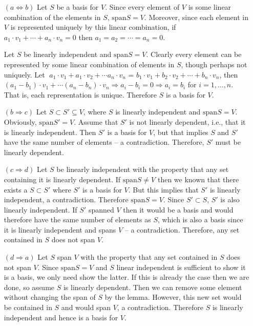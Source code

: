 \documentclass[12pt]{article}
\begin{document}
\begin{enumerate}
\begin{enumerate}
\item[$(a \Leftrightarrow b)$] Let $S$ be a basis for $V$.  Since every element of $V$ is some linear combination of the elements in $S$, $\mathrm{span} S = V$.  Moreover, since each element in $V$ is represented uniquely by this linear combination, if $a_1 \cdot v_1 + \cdots + a_n \cdot v_n = 0$ then $a_1=a_2=\cdots=a_n=0$.

Let $S$ be linearly independent and $\mathrm{span} S = V$.  Clearly every element can be represented by some linear combination of elements in $S$, though perhaps not uniquely.  Let 񄔳$a_1 \cdot v_1 + a_1 \cdot v_2 + \cdots a_n \cdot v_n$ = $b_1 \cdot v_1 + b_2 \cdot v_2 + \cdots + b_n \cdot v_n$, then $(a_1 - b_1) \cdot v_1 + \cdots (a_n - b_n) \cdot v_n \Rightarrow a_i - b_i = 0 \Rightarrow a_i = b_i$ for $i=1,\ldots,n$.  That is, each representation is unique.  Therefore $S$ is a basis for $V$. 

\item[$(b \Rightarrow c)$] Let $S \subset S' \subseteq V$, where $S$ is linearly independent and $\mathrm{span} S = V$.  Obviously, $\mathrm{span} S' = V$.  Assume that $S'$ is not linearly dependent, i.e., that it is linearly independent.  Then $S'$ is a basis for $V$, but that implies $S$ and $S'$ have the same number of elements -- a contradiction.  Therefore, $S'$ must be linearly dependent.

\item[$(c \Rightarrow d)$]  Let $S$ be linearly independent with the property that any set containing it is linearly dependent.  If $\mathrm{span} S \neq V$ then we known that there exists a $S \subset S'$ where $S'$ is a basis for $V$.  But this implies that $S'$ is linearly independent, a contradiction.  Therefore $\mathrm{span} S = V$.  Since $S' \subset S$, $S'$ is also linearly independent.  If $S'$ spanned $V$ then it would be a basis and would therefore have the same number of elements as $S$, which is also a basis since it is linearly independent and spans $V$ -- a contradiction.  Therefore, any set contained in $S$ does not span $V$.

\item[$(d \Rightarrow a)$] Let $S$ span $V$ with the property that any set contained in $S$ does not span $V$.  Since $\mathrm{span} S = V$ and $S$ linear independent is sufficient to show it is a basis, we only need show the latter.  If this is already the case then we are done, so assume $S$ is linearly dependent.  Then we can remove some element without changing the span of $S$ by the lemma.  However, this new set would be contained in $S$ and would span $V$, a contradiction.  Therefore $S$ is linearly independent and hence is a basis for $V$.


\end{enumerate}
\end{enumerate}
\end{document}
